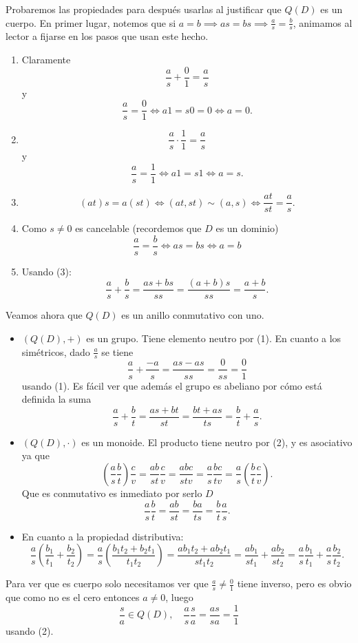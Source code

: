 \begin{proofbox}
Probaremos las propiedades para después usarlas al justificar que $Q(D)$ es un cuerpo. En primer lugar, notemos que si $a = b \implies as = bs \implies \frac{a}{s} = \frac{b}{s}$, animamos al lector a fijarse en los pasos que usan este hecho.
\begin{enumerate}
\item Claramente
\[
\frac{a}{s} + \frac{0}{1} = \frac{a}{s}
\]
y
\[
\frac{a}{s} = \frac{0}{1} \iff a1 = s0 = 0 \iff a = 0.
\]

\item
\[
\frac{a}{s} \cdot \frac{1}{1} = \frac{a}{s}
\]
y
\[
\frac{a}{s} = \frac{1}{1} \iff a1 = s1 \iff a = s.
\]

\item 
\[
(at)s = a(st) \iff (at, st) \sim (a, s) \iff \frac{at}{st} = \frac{a}{s}.
\]

\item Como $s \neq 0$ es cancelable (recordemos que $D$ es un dominio)
\[
\frac{a}{s} = \frac{b}{s} \iff as = bs \iff a = b
\]

\item Usando (3):
\[
\frac{a}{s} + \frac{b}{s} = \frac{as + bs}{ss} = \frac{(a+b)s}{ss} = \frac{a + b}{s}.
\]
\end{enumerate}

Veamos ahora que \(Q(D)\) es un anillo conmutativo con uno.
\begin{itemize}
    \item \((Q(D), +)\) es un grupo. Tiene elemento neutro por (1). En cuanto a los simétricos, dado \(\frac{a}{s}\) se tiene
    \[
    \frac{a}{s} + \frac{-a}{s} = \frac{as - as}{ss} = \frac{0}{ss} = \frac{0}{1}
    \]
    usando (1). Es fácil ver que además el grupo es abeliano por cómo está definida la suma
    \[
    \frac{a}{s} + \frac{b}{t} = \frac{as + bt}{st} = \frac{bt + as}{ts} = \frac{b}{t} + \frac{a}{s}.
    \]

    \item \((Q(D), \cdot)\) es un monoide. El producto tiene neutro por (2), y es asociativo ya que
    \[
    (\frac{a}{s} \frac{b}{t}) \frac{c}{v} = \frac{ab}{st} \frac{c}{v} = \frac{abc}{stv} = \frac{a}{s} \frac{bc}{tv} = \frac{a}{s}(\frac{b}{t} \frac{c}{v}).
    \]
    Que es conmutativo es inmediato por serlo \(D\)
    \[
    \frac{a}{s} \frac{b}{t} = \frac{ab}{st} = \frac{ba}{ts} = \frac{b}{t} \frac{a}{s}.
    \]

    \item En cuanto a la propiedad distributiva:
    \[
    \frac{a}{s}\left(\frac{b_1}{t_1} + \frac{b_2}{t_2}\right) = \frac{a}{s}\left(\frac{b_1 t_2 + b_2 t_1}{t_1 t_2}\right) = \frac{ab_1 t_2 + ab_2 t_1}{st_1 t_2} = \frac{ab_1}{st_1} + \frac{ab_2}{st_2} = \frac{a}{s}\frac{b_1}{t_1} + \frac{a}{s}\frac{b_2}{t_2}.
    \]
\end{itemize}
Para ver que es cuerpo solo necesitamos ver que $\frac{a}{s} \neq \frac{0}{1}$ tiene inverso, pero es obvio que como no es el cero entonces $a \neq 0$, luego
\[
\frac{s}{a} \in Q(D),\quad \frac{a}{s}\frac{s}{a} = \frac{as}{sa} = \frac{1}{1}
\]
usando (2).
\end{proofbox}

